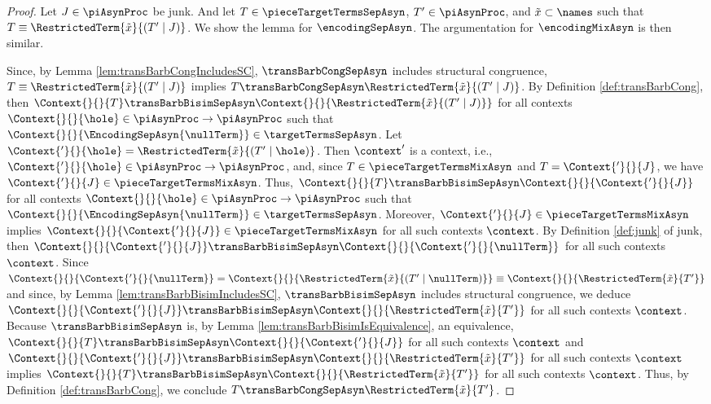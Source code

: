 \documentclass[]{llncs}
\begin{document}
\begin{proof}
	Let $ J \in \piAsynProc $ be junk. And let $ T \in \pieceTargetTermsSepAsyn $, $ T' \in \piAsynProc $, and $ \tilde{x} \subset \names $ such that $ T \equiv \RestrictedTerm{\tilde{x}}{\left( T' \mid J \right)} $. We show the lemma for $ \encodingSepAsyn $. The argumentation for $ \encodingMixAsyn $ is then similar.
	
	Since, by Lemma \ref{lem:transBarbCongIncludesSC}, $ \transBarbCongSepAsyn $ includes structural congruence, $ T \equiv \RestrictedTerm{\tilde{x}}{\left( T' \mid J \right)} $ implies $ T \transBarbCongSepAsyn \RestrictedTerm{\tilde{x}}{\left( T' \mid J \right)} $. By Definition \ref{def:transBarbCong}, then $ \Context{}{}{T} \transBarbBisimSepAsyn \Context{}{}{\RestrictedTerm{\tilde{x}}{\left( T' \mid J \right)}} $ for all contexts $ \Context{}{}{\hole} \in \piAsynProc \to \piAsynProc $ such that $ \Context{}{}{\EncodingSepAsyn{\nullTerm}} \in \targetTermsSepAsyn $. Let $ \Context{'}{}{\hole} = \RestrictedTerm{\tilde{x}}{\left( T' \mid \hole \right)} $. Then $ \context' $ is a context, i.e., $ \Context{'}{}{\hole} \in \piAsynProc \to \piAsynProc $, and, since $ T \in \pieceTargetTermsMixAsyn $ and $ T = \Context{'}{}{J} $, we have $ \Context{'}{}{J} \in \pieceTargetTermsMixAsyn $. Thus, $ \Context{}{}{T} \transBarbBisimSepAsyn \Context{}{}{\Context{'}{}{J}} $ for all contexts $ \Context{}{}{\hole} \in \piAsynProc \to \piAsynProc $ such that $ \Context{}{}{\EncodingSepAsyn{\nullTerm}} \in \targetTermsSepAsyn $. Moreover, $ \Context{'}{}{J} \in \pieceTargetTermsMixAsyn $ implies $ \Context{}{}{\Context{'}{}{J}} \in \pieceTargetTermsMixAsyn $ for all such contexts $ \context $. By Definition \ref{def:junk} of junk, then $ \Context{}{}{\Context{'}{}{J}} \transBarbBisimSepAsyn \Context{}{}{\Context{'}{}{\nullTerm}} $ for all such contexts $ \context $. Since $ \Context{}{}{\Context{'}{}{\nullTerm}} = \Context{}{}{\RestrictedTerm{\tilde{x}}{\left( T' \mid \nullTerm \right)}} \equiv \Context{}{}{\RestrictedTerm{\tilde{x}}{T'}} $ and since, by Lemma \ref{lem:transBarbBisimIncludesSC}, $ \transBarbBisimSepAsyn $ includes structural congruence, we deduce $ \Context{}{}{\Context{'}{}{J}} \transBarbBisimSepAsyn \Context{}{}{\RestrictedTerm{\tilde{x}}{T'}} $ for all such contexts $ \context $. Because $ \transBarbBisimSepAsyn $ is, by Lemma \ref{lem:transBarbBisimIsEquivalence}, an equivalence, $ \Context{}{}{T} \transBarbBisimSepAsyn \Context{}{}{\Context{'}{}{J}} $ for all such contexts $ \context $ and $ \Context{}{}{\Context{'}{}{J}} \transBarbBisimSepAsyn \Context{}{}{\RestrictedTerm{\tilde{x}}{T'}} $ for all such contexts $ \context $ implies $ \Context{}{}{T} \transBarbBisimSepAsyn \Context{}{}{\RestrictedTerm{\tilde{x}}{T'}} $ for all such contexts $ \context $. Thus, by Definition \ref{def:transBarbCong}, we conclude $ T \transBarbCongSepAsyn \RestrictedTerm{\tilde{x}}{T'} $.
	

\end{proof}
\end{document}
